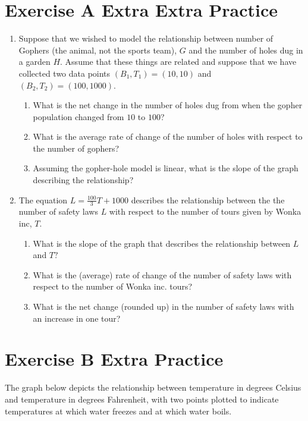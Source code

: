 \documentclass[10pt]{article}
\begin{document}
\newpage
\section{Exercise A Extra Extra Practice}

\begin{enumerate}

\item[(a)] Suppose that we wished to model the relationship between number of Gophers (the animal, not the sports team), $G$ and the number of holes dug in a garden $H$. Assume that these things are related and suppose that we have collected two data points $(B_1, T_1) = (10, 10)$ and $(B_2, T_2) = (100, 1000).$
    \begin{enumerate}
        \item[(i)] What is the net change in the number of holes dug from when the gopher population changed from $10$ to $100$?
        \item[(ii)]What is the average rate of change of the number of holes with respect to the number of gophers?
        \item[(iii)]Assuming the gopher-hole model is linear, what is the slope of the graph describing the relationship?
    \end{enumerate}
\item[(b)] The equation $L = \frac{100}{3}T + 1000$ describes the relationship between the the number of safety laws $L$ with respect to the number of tours given by Wonka inc, $T$.
    \begin{enumerate}
        \item[(i)] What is the slope of the graph that describes the relationship between $L$ and $T?$
        \item[(ii)]What is the (average) rate of change of the number of safety laws with respect to the number of Wonka inc. tours?
        \item[(iii)] What is the net change (rounded up) in the number of safety laws with an increase in one tour?
    \end{enumerate}

\end{enumerate}

\newpage
\section{Exercise B Extra Practice}



The graph below depicts the relationship between temperature in degrees Celsius and temperature in degrees Fahrenheit, with two points plotted to indicate temperatures at which water freezes and at which water boils.
\end{document}
